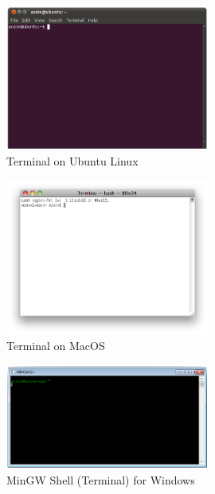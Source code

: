 \begin{figure}[p]
   \centering
   \includegraphics[width=0.6\textwidth]{./topics/program-creation/images/UbuntuTerminal} 
   \caption{Terminal on Ubuntu Linux}
   \label{fig:program-creation-ubuntu-terminal}
\end{figure}

\begin{figure}[p]
   \centering
   \includegraphics[width=0.6\textwidth]{./topics/program-creation/images/MacOSTerminal} 
   \caption{Terminal on MacOS}
   \label{fig:program-creation-macos-terminal}
\end{figure}

\begin{figure}[p]
   \centering
   \includegraphics[width=0.6\textwidth]{./topics/program-creation/images/MinGWShell} 
   \caption{MinGW Shell (Terminal) for Windows}
   \label{fig:program-creation-mingw-shell}
\end{figure}

